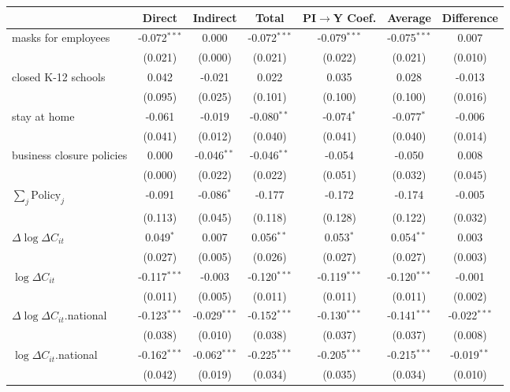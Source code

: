 
\begin{tabular}{lccccc|>{}c}
\toprule
  & Direct & Indirect & Total & PI$\to$Y Coef. & Average & Difference\\
\midrule
masks for employees & -0.072$^{***}$ & 0.000 & -0.072$^{***}$ & -0.079$^{***}$ & -0.075$^{***}$ & 0.007\\
 & (0.021) & (0.000) & (0.021) & (0.022) & (0.021) & (0.010)\\
closed K-12 schools & 0.042 & -0.021 & 0.022 & 0.035 & 0.028 & -0.013\\
 & (0.095) & (0.025) & (0.101) & (0.100) & (0.100) & (0.016)\\
stay at home & -0.061 & -0.019 & -0.080$^{**}$ & -0.074$^{*}$ & -0.077$^{*}$ & -0.006\\
 & (0.041) & (0.012) & (0.040) & (0.041) & (0.040) & (0.014)\\
business closure policies & 0.000 & -0.046$^{**}$ & -0.046$^{**}$ & -0.054 & -0.050 & 0.008\\
 & (0.000) & (0.022) & (0.022) & (0.051) & (0.032) & (0.045)\\
$\sum_j \mathrm{Policy}_j$ & -0.091 & -0.086$^{*}$ & -0.177 & -0.172 & -0.174 & -0.005\\
 & (0.113) & (0.045) & (0.118) & (0.128) & (0.122) & (0.032)\\
$\Delta \log \Delta C_{it}$ & 0.049$^{*}$ & 0.007 & 0.056$^{**}$ & 0.053$^{*}$ & 0.054$^{**}$ & 0.003\\
 & (0.027) & (0.005) & (0.026) & (0.027) & (0.027) & (0.003)\\
$\log \Delta C_{it}$ & -0.117$^{***}$ & -0.003 & -0.120$^{***}$ & -0.119$^{***}$ & -0.120$^{***}$ & -0.001\\
 & (0.011) & (0.005) & (0.011) & (0.011) & (0.011) & (0.002)\\
$\Delta \log \Delta C_{it}$.national & -0.123$^{***}$ & -0.029$^{***}$ & -0.152$^{***}$ & -0.130$^{***}$ & -0.141$^{***}$ & -0.022$^{***}$\\
 & (0.038) & (0.010) & (0.038) & (0.037) & (0.037) & (0.008)\\
$\log \Delta C_{it}$.national & -0.162$^{***}$ & -0.062$^{***}$ & -0.225$^{***}$ & -0.205$^{***}$ & -0.215$^{***}$ & -0.019$^{**}$\\
 & (0.042) & (0.019) & (0.034) & (0.035) & (0.034) & (0.010)\\
\bottomrule
\end{tabular}
